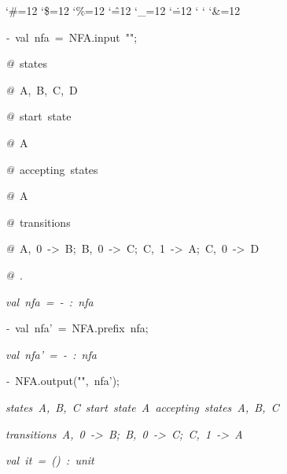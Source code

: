 \begin{list}{}
{\setlength{\leftmargin}{\leftmargini}
\setlength{\rightmargin}{0cm}
\setlength{\itemindent}{0cm}
\setlength{\listparindent}{0cm}
\setlength{\itemsep}{0cm}
\setlength{\parsep}{0cm}
\setlength{\labelsep}{0cm}
\setlength{\labelwidth}{0cm}
\catcode`\#=12
\catcode`\$=12
\catcode`\%=12
\catcode`\^=12
\catcode`\_=12
\catcode`\.=12
\catcode`
\catcode`
\catcode`\&=12
\ttfamily}
\small
\item[]\textsl{-\ }val\ nfa\ =\ NFA.input\ "";
\item[]\textsl{@\ }states
\item[]\textsl{@\ }A,\ B,\ C,\ D
\item[]\textsl{@\ }start\ state
\item[]\textsl{@\ }A
\item[]\textsl{@\ }accepting\ states
\item[]\textsl{@\ }A
\item[]\textsl{@\ }transitions
\item[]\textsl{@\ }A,\ 0\ ->\ B;\ B,\ 0\ ->\ C;\ C,\ 1\ ->\ A;\ C,\ 0\ ->\ D
\item[]\textsl{@\ }.
\item[]\textsl{val\ nfa\ =\ -\ :\ nfa}
\item[]\textsl{-\ }val\ nfa'\ =\ NFA.prefix\ nfa;
\item[]\textsl{val\ nfa'\ =\ -\ :\ nfa}
\item[]\textsl{-\ }NFA.output("",\ nfa');
\item[]\textsl{states\ A,\ B,\ C\ start\ state\ A\ accepting\ states\ A,\ B,\ C}
\item[]\textsl{transitions\ A,\ 0\ ->\ B;\ B,\ 0\ ->\ C;\ C,\ 1\ ->\ A}
\item[]\textsl{val\ it\ =\ ()\ :\ unit}
\end{list}
